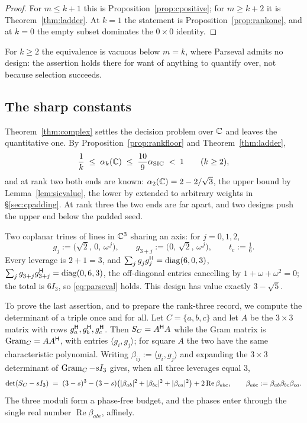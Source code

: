 \begin{proof}
For $m\le k+1$ this is Proposition~\ref{prop:cpositive}; for $m\ge k+2$ it
is Theorem~\ref{thm:ladder}.  At $k=1$ the statement is
Proposition~\ref{prop:rankone}, and at $k=0$ the empty subset dominates
the $0\times0$ identity.
\end{proof}

For $k\ge2$ the equivalence is vacuous below $m=k$, where Parseval admits
no design: the assertion holds there for want of anything to
quantify over, not because selection succeeds.

\subsection{The sharp constants}\label{sec:csharp}

Theorem~\ref{thm:complex} settles the decision problem over $\mathbb{C}$ and
leaves the quantitative one.  By Proposition~\ref{prop:rankfloor} and
Theorem~\ref{thm:ladder},
\[
  \frac1k\;\le\;\alpha_k(\mathbb{C})\;\le\;\frac{10}{9}\alpha_{\mathrm{SIC}}\;<\;1
  \qquad(k\ge2),
\]
and at rank two both ends are known: $\alpha_2(\mathbb{C})=2-2/\sqrt3$, the upper
bound by Lemma~\ref{lem:sicvalue}, the lower by
\cite{Nesterenko2026complex} extended to arbitrary weights in
\S\ref{sec:cpadding}.  At rank three the two ends are far apart, and two
designs push the upper end below the padded seed.

\begin{example}[Lean]\label{ex:trine}
Two coplanar trines of lines in $\mathbb{C}^{3}$ sharing an axis: for $j=0,1,2$,
\[
  g_j:=\bigl(\sqrt2,\,0,\,\omega^{\,j}\bigr),
  \qquad
  g_{3+j}:=\bigl(0,\,\sqrt2,\,\omega^{\,j}\bigr),
  \qquad t_c:=\tfrac16 .
\]
Every leverage is $2+1=3$, and
$\sum_{j}g_j^{\vphantom{\mathsf{H}}}g_j\adj=\diag(6,0,3)$,
$\sum_{j}g_{3+j}^{\vphantom{\mathsf{H}}}g_{3+j}\adj=\diag(0,6,3)$, the off-diagonal
entries cancelling by $1+\omega+\omega^{2}=0$; the total is $6I_3$, so
\eqref{eq:parseval} holds.  This design has value exactly $3-\sqrt5$.
\end{example}

To prove the last assertion, and to prepare the rank-three record, we
compute the determinant of a triple once and for all.  Let $C=\{a,b,c\}$
and let $A$ be the $3\times3$ matrix with rows
$g_a^{\mathsf{H}},g_b^{\mathsf{H}},g_c^{\mathsf{H}}$.  Then $S_{C}=A^{\mathsf{H}} A$
while the Gram matrix is $\operatorname{Gram}_C=AA^{\mathsf{H}}$, with entries
$\langle g_i,g_j\rangle$; for square $A$ the two have the same
characteristic polynomial.  Writing $\beta_{ij}:=\langle g_i,g_j\rangle$
and expanding the $3\times3$ determinant of
$\operatorname{Gram}_C-sI_3$ gives, when all three leverages equal $3$,
\begin{equation}\label{eq:tripledet}
  \det(S_{C}-sI_3)
  \;=\;(3-s)^{3}
      -(3-s)\bigl(\lvert\beta_{ab}\rvert^{2}+\lvert\beta_{bc}\rvert^{2}
              +\lvert\beta_{ca}\rvert^{2}\bigr)
      +2\operatorname{Re}\beta_{abc},
  \qquad
  \beta_{abc}:=\beta_{ab}\beta_{bc}\beta_{ca}.
\end{equation}
The three moduli form a phase-free budget, and the phases enter through
the single real number $\operatorname{Re}\beta_{abc}$, affinely.

